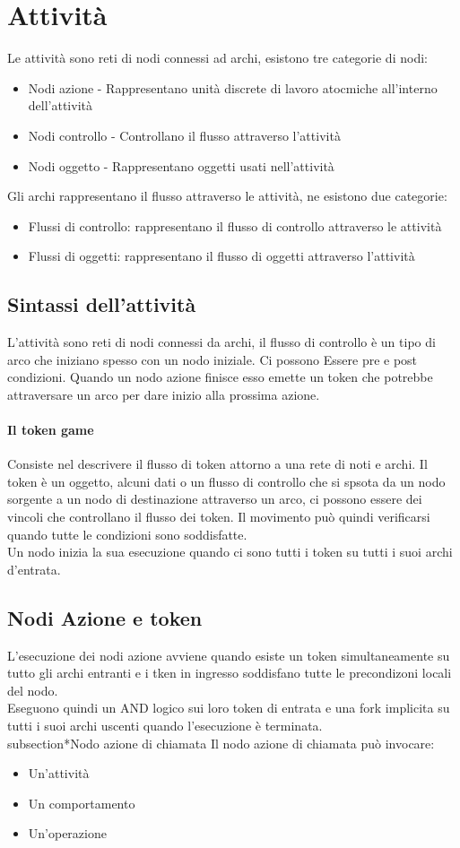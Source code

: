 \section{Attività}
Le attività sono reti di nodi connessi ad archi, esistono tre categorie di nodi:
\begin{itemize}
    \item Nodi azione - Rappresentano unità discrete di lavoro atocmiche all'interno dell'attività
    \item Nodi controllo - Controllano il flusso attraverso l'attività
    \item Nodi oggetto - Rappresentano oggetti usati nell'attività
\end{itemize}
Gli archi rappresentano il flusso attraverso le attività, ne esistono due categorie:
\begin{itemize}
    \item Flussi di controllo: rappresentano il flusso di controllo attraverso le attività
    \item Flussi di oggetti: rappresentano il flusso di oggetti attraverso l'attività
\end{itemize}
\subsection{Sintassi dell'attività}
L'attività sono reti di nodi connessi da archi, il flusso di controllo
è un tipo di arco che iniziano spesso con un nodo iniziale. Ci possono
Essere pre e post condizioni. Quando un nodo azione finisce esso emette un token che potrebbe
attraversare un arco per dare inizio alla prossima azione.
\paragraph*{Il token game} Consiste nel descrivere il flusso di token attorno a una rete
di noti e archi. 
Il token è un oggetto, alcuni dati o un flusso di controllo che si spsota da un nodo sorgente a un nodo di
destinazione attraverso un arco, ci possono essere dei vincoli che controllano il flusso dei token.
Il movimento può quindi verificarsi quando tutte le condizioni sono soddisfatte.
\\ Un nodo inizia la sua esecuzione quando ci sono tutti i token su tutti i suoi archi d'entrata.
\subsection*{Nodi Azione e token}
L'esecuzione dei nodi azione avviene quando esiste un token simultaneamente su tutto gli archi entranti
e i tken in ingresso soddisfano tutte le precondizoni locali del nodo.
\\ Eseguono quindi un AND logico sui loro token di entrata e una fork implicita su tutti i suoi archi uscenti quando
l'esecuzione è terminata.
\\subsection*{Nodo azione di chiamata}
Il nodo azione di chiamata può invocare:
\begin{itemize}
    \item Un'attività
    \item Un comportamento
    \item Un'operazione
\end{itemize}
